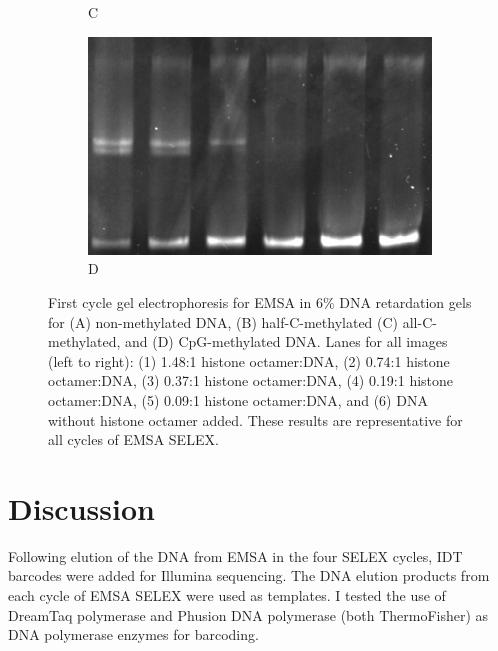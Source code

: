 \documentclass[parskip=full, numbers=noenddot]{scrreprt}
\begin{document}
\begin{figure}[htpb]
\begin{subfigure}[htpb]{0.4\textwidth}
    \caption{C}
    \label{fig:reconstnuc_c}
  \end{subfigure}
  \begin{subfigure}[htpb]{0.4\textwidth}
    \centering
    \includegraphics[width=\textwidth]{reconstnuc_d}
    \caption{D}
    \label{fig:reconstnuc_d}
  \end{subfigure}
  \caption{First cycle gel electrophoresis for EMSA in 6\% DNA retardation gels for (A) non-methylated DNA, (B) half-C-methylated (C) all-C-methylated, and (D) CpG-methylated DNA. Lanes for all images (left to right): (1) 1.48:1 histone octamer:DNA, (2) 0.74:1 histone octamer:DNA, (3) 0.37:1 histone octamer:DNA, (4) 0.19:1 histone octamer:DNA, (5) 0.09:1 histone octamer:DNA, and (6) DNA without histone octamer added. These results are representative for all cycles of EMSA SELEX.}
  \label{fig:reconstnuc}
\end{figure}


\section{Discussion}
\label{sec:emsaselex_discussion}


Following elution of the DNA from EMSA in the four SELEX cycles, IDT barcodes were added for Illumina sequencing. The DNA elution products from each cycle of EMSA SELEX were used as templates. I tested the use of DreamTaq polymerase and Phusion DNA polymerase (both ThermoFisher) as DNA polymerase enzymes for barcoding.
\end{document}
